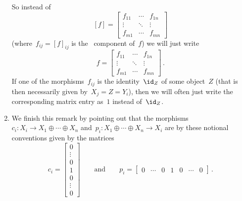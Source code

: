 \begin{remark*}
\begin{enumerate}
      So instead of
      \[
          [f]
        = \begin{bmatrix}
            f_{11}  & \cdots  & f_{1n}  \\
            \vdots  & \ddots  & \vdots  \\
            f_{m1}  & \cdots  & f_{mn}
          \end{bmatrix}
      \]
      (where~$f_{ij} = [f]_{ij}$ is the~ component of~$f$) we will just write
      \[
          f
        = \begin{bmatrix}
            f_{11}  & \cdots  & f_{1n}  \\
            \vdots  & \ddots  & \vdots  \\
            f_{m1}  & \cdots  & f_{mn}
          \end{bmatrix} \,.
      \]
      If one of the morphisms~$f_{ij}$ is the identity~$\id_Z$ of some object~$Z$ (that is then necessarily given by~$X_j = Z = Y_i$), then we will often just write the corresponding matrix entry as~$1$ instead of~$\id_Z$.
    \item
      We finish this remark by pointing out that the morphisms~$c_i \colon X_i \to X_1 \oplus \dotsb \oplus X_n$ and~$p_i \colon X_1 \oplus \dotsb \oplus X_n \to X_i$ are by these notional conventions given by the matrices
      \[
          c_i
        = \begin{bmatrix}
            0 \\ \vdots \\ 0 \\ 1 \\ 0 \\ \vdots \\ 0
          \end{bmatrix}
        \qquad\text{and}\qquad
          p_i
        = \begin{bmatrix}
            0 & \cdots & 0 & 1 & 0 & \cdots & 0
          \end{bmatrix} \,.
      \]
  \end{enumerate}
\end{remark*}


